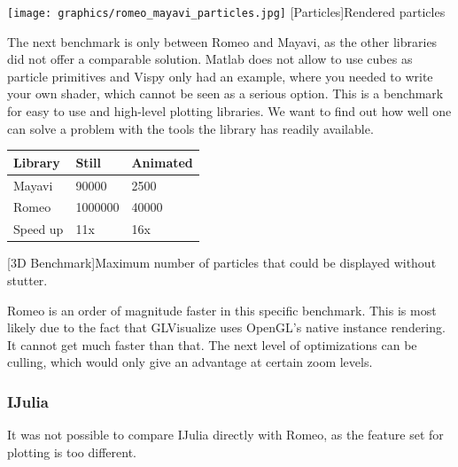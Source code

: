 \begin{minipage}{\linewidth}
    \centering
    \texttt{[image: graphics/romeo\_mayavi\_particles.jpg]}
    [Particles]{Rendered particles}
    \label{fig:reactive1}
\end{minipage}

The next benchmark is only between Romeo and Mayavi, as the other libraries did not offer a comparable solution. Matlab does not allow to use cubes as particle primitives and Vispy only had an example, where you needed to write your own shader, which cannot be seen as a serious option. This is a benchmark for easy to use and high-level plotting libraries. We want to find out how well one can solve a problem with the tools the library has readily available.

\begin{table}[htbp]
    \centering
    \begin{tabular}{l|l|l}
        \hline
        \textbf{Library} & \textbf{Still}  & \textbf{Animated}  \\ 
        \hline
        Mayavi           & 90000           & 2500  \\
        Romeo            & 1000000         & 40000 \\
        \hline
        \hline
        Speed up         & 11x             & 16x \\
    \end{tabular}
    [3D Benchmark]{Maximum number of particles that could be displayed without stutter.}
    \label{table:relativespeedoglw}
\end{table}

Romeo is an order of magnitude faster in this specific benchmark. This is most likely due to the fact that GLVisualize uses OpenGL's native instance rendering.
It cannot get much faster than that. The next level of optimizations can be culling, which would only give an advantage at certain zoom levels.

\subsubsection{IJulia}

It was not possible to compare IJulia directly with Romeo, as the feature set for plotting is too different.

